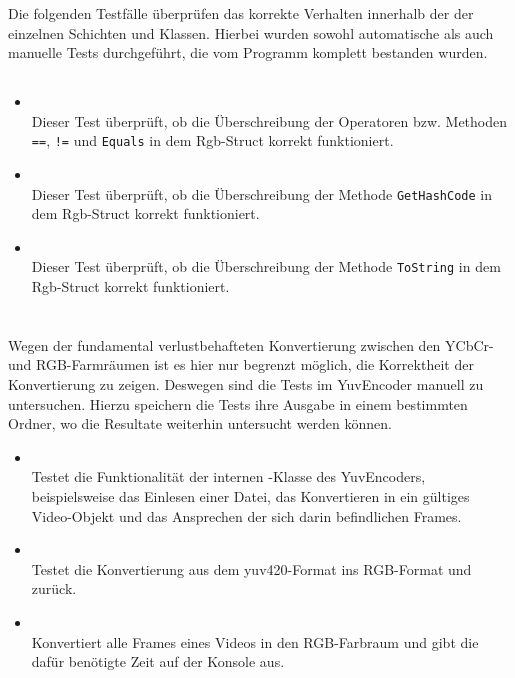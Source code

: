 Die folgenden Testfälle überprüfen das korrekte Verhalten innerhalb der der einzelnen Schichten und Klassen. Hierbei wurden sowohl automatische als auch manuelle Tests durchgeführt, die vom Programm komplett bestanden wurden.

\subsection{}

\paragraph{}

\begin{itemize}

\item{}~\\
Dieser Test überprüft, ob die Überschreibung der Operatoren bzw. Methoden \verb#==#, \verb#!=# und \verb#Equals# in dem Rgb-Struct korrekt funktioniert.

\item{}~\\
Dieser Test überprüft, ob die Überschreibung der Methode \verb#GetHashCode# in dem Rgb-Struct korrekt funktioniert.

\item{}~\\
Dieser Test überprüft, ob die Überschreibung der Methode \verb#ToString# in dem Rgb-Struct korrekt funktioniert.
\end{itemize}

\paragraph{}~\\
Wegen der fundamental verlustbehafteten Konvertierung zwischen den YCbCr- und RGB-Farmräumen ist es hier nur begrenzt möglich, die Korrektheit der Konvertierung zu zeigen. Deswegen sind die Tests im YuvEncoder manuell zu untersuchen. Hierzu speichern die Tests ihre Ausgabe in einem bestimmten Ordner, wo die Resultate weiterhin untersucht werden können.
\begin{itemize}
	\item {}~\\
	Testet die Funktionalität der internen -Klasse des YuvEncoders, beispielsweise das Einlesen einer Datei, das Konvertieren in ein gültiges Video-Objekt und das Ansprechen der sich darin befindlichen Frames.
	\item {}~\\
	Testet die Konvertierung aus dem yuv420-Format ins RGB-Format und zurück.
	\item {}~\\
	Konvertiert alle Frames eines Videos in den RGB-Farbraum und gibt die dafür benötigte Zeit auf der Konsole aus.
\end{itemize}

